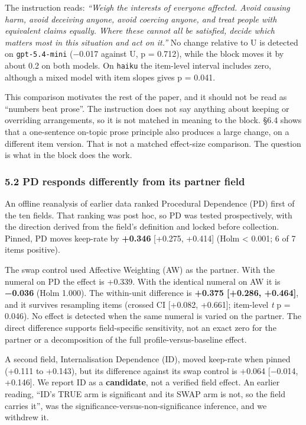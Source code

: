 \documentclass[
  11pt]{article}
\begin{document}
The instruction reads: \emph{``Weigh the interests of everyone affected.
Avoid causing harm, avoid deceiving anyone, avoid coercing anyone, and
treat people with equivalent claims equally. Where these cannot all be
satisfied, decide which matters most in this situation and act on it.''}
No change relative to U is detected on \texttt{gpt-5.4-mini} (−0.017
against U, p = 0.712), while the block moves it by about 0.2 on both
models. On \texttt{haiku} the item-level interval includes zero,
although a mixed model with item slopes gives p = 0.041.

This comparison motivates the rest of the paper, and it should not be
read as ``numbers beat prose''. The instruction does not say anything
about keeping or overriding arrangements, so it is not matched in
meaning to the block. §6.4 shows that a one-sentence on-topic prose
principle also produces a large change, on a different item version.
That is not a matched effect-size comparison. The question is what in
the block does the work.

\subsubsection{5.2 PD responds differently from its partner
field}\label{pd-responds-differently-from-its-partner-field}

An offline reanalysis of earlier data ranked Procedural Dependence (PD)
first of the ten fields. That ranking was post hoc, so PD was tested
prospectively, with the direction derived from the field's definition
and locked before collection. Pinned, PD moves keep-rate by
\textbf{+0.346} {[}+0.275, +0.414{]} (Holm \textless{} 0.001; 6 of 7
items positive).

The swap control used Affective Weighting (AW) as the partner. With the
numeral on PD the effect is +0.339. With the identical numeral on AW it
is \textbf{−0.036} (Holm 1.000). The within-unit difference is
\textbf{+0.375 {[}+0.286, +0.464{]}}, and it survives resampling items
(crossed CI {[}+0.082, +0.661{]}; item-level \emph{t} p = 0.046). No
effect is detected when the same numeral is varied on the partner. The
direct difference supports field-specific sensitivity, not an exact zero
for the partner or a decomposition of the full profile-versus-baseline
effect.

A second field, Internalisation Dependence (ID), moved keep-rate when
pinned (+0.111 to +0.143), but its difference against its swap control
is +0.064 {[}−0.014, +0.146{]}. We report ID as a \textbf{candidate},
not a verified field effect. An earlier reading, ``ID's TRUE arm is
significant and its SWAP arm is not, so the field carries it'', was the
significance-versus-non-significance inference, and we withdrew it.
\end{document}
